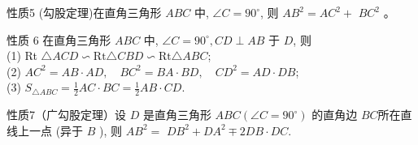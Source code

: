 \documentclass[10pt]{article}
\begin{document}
性质5 (勾股定理)在直角三角形 $A B C$ 中, $\angle C=90^{\circ}$, 则 $A B^{2}=A C^{2}+$ $B C^{2}$ 。

性质 6 在直角三角形 $A B C$ 中, $\angle C=90^{\circ}, C D \perp A B$ 于 $D$, 则\\
(1) Rt $\triangle A C D \backsim \mathrm{Rt} \triangle C B D \backsim \mathrm{Rt} \triangle A B C$;\\
(2) $A C^{2}=A B \cdot A D, \quad B C^{2}=B A \cdot B D, \quad C D^{2}=A D \cdot D B$;\\
(3) $S_{\triangle A B C}=\frac{1}{2} A C \cdot B C=\frac{1}{2} A B \cdot C D$.

性质7（广勾股定理）设 $D$ 是直角三角形 $A B C\left(\angle C=90^{\circ}\right)$ 的直角边 $B C$所在直线上一点 (异于 $B$ ), 则 $A B^{2}=$ $D B^{2}+D A^{2} \mp 2 D B \cdot D C$.
\end{document}
